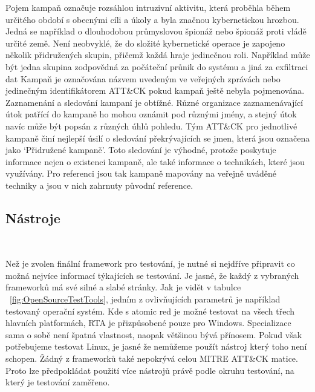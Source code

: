 Pojem kampaň označuje rozsáhlou intruzivní aktivitu, která proběhla během určitého období s obecnými cíli a úkoly a byla značnou kybernetickou hrozbou.
Jedná se například o dlouhodobou průmyslovou špionáž nebo špionáž proti vládě určité země.
Není neobvyklé, že do složité kybernetické operace je zapojeno několik přidružených skupin, přičemž každá hraje jedinečnou roli.
Například může být jedna skupina zodpovědná za počáteční průnik do systému a jiná za exfiltraci dat
Kampaň je označována názvem uvedeným ve veřejných zprávách nebo jedinečným identifikátorem ATT\&CK pokud kampaň ještě nebyla pojmenována.
Zaznamenání a sledování kampaní je obtížné.
Různé organizace zaznamenávající útok patřící do kampaně ho mohou oznámit pod různými jmény, a stejný útok navíc může být popsán z různých úhlů pohledu.
Tým ATT\&CK pro jednotlivé kampaně činí nejlepší úsilí o sledování překrývajících se jmen, která jsou označena jako `Přidružené kampaně'.
Toto sledování je výhodné, protože poskytuje informace nejen o existenci kampaně, ale také informace o technikách, které jsou využívány.
Pro referenci jsou tak kampaně mapovány na veřejně uváděné techniky a jsou v nich zahrnuty původní reference.\cite{Mitre_campaigns}

\subsection{Nástroje}\label{subsec:nastroje}
~

Než je zvolen finální framework pro testování, je nutné si nejdříve připravit co možná nejvíce informací týkajících se testování.
Je jasné, že každý z vybraných frameworků má své silné a slabé stránky.
Jak je vidět v tabulce ~\ref{fig:OpenSourceTestTools}, jedním z ovlivňujících parametrů je například testovaný operační systém.
Kde s atomic red je možné testovat na všech třech hlavních platformách, \ac{RTA} je přizpůsobené pouze pro Windows.
Specializace sama o sobě není špatná vlastnost, naopak většinou bývá přínosem.
Pokud však potřebujeme testovat Linux, je jasné že nemůžeme použít nástroj který toho není schopen.
Žádný z frameworků také nepokrývá celou MITRE ATT\&CK matice.
Proto lze předpokládat použití více nástrojů právě podle okruhu testování, na který je testování zaměřeno.

